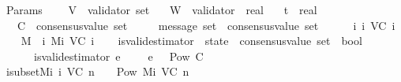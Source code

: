 \begin{isabellebody}
\isanewline
{}\isamarkupfalse%
\ Params\ {\isacharequal}\isanewline
\ \ \ V\ {\isacharcolon}{\isacharcolon}\ {\isachardoublequoteopen}validator\ set{\isachardoublequoteclose}\isanewline
\ \ \ W\ {\isacharcolon}{\isacharcolon}\ {\isachardoublequoteopen}validator\ {\isasymRightarrow}\ real{\isachardoublequoteclose}\isanewline
\ \ \ t\ {\isacharcolon}{\isacharcolon}\ real\isanewline
\ \ \ C\ {\isacharcolon}{\isacharcolon}\ {\isachardoublequoteopen}consensus{\isacharunderscore}value\ set{\isachardoublequoteclose}\isanewline
\ \ \ {\isasymepsilon}\ {\isacharcolon}{\isacharcolon}\ {\isachardoublequoteopen}message\ set\ {\isasymRightarrow}\ consensus{\isacharunderscore}value\ set{\isachardoublequoteclose}\isanewline
\isanewline
{}\isanewline
\ \ \isamarkupfalse%
\ {\isachardoublequoteopen}{\isasymSigma}\ {\isacharequal}\ {\isacharparenleft}{\isasymUnion}i{\isasymin}{\isasymnat}{\isachardot}\ {\isasymSigma}{\isacharunderscore}i\ {\isacharparenleft}V{\isacharcomma}C{\isacharcomma}{\isasymepsilon}{\isacharparenright}\ i{\isacharparenright}{\isachardoublequoteclose}\isanewline
\ \ \isamarkupfalse%
\ {\isachardoublequoteopen}M\ {\isacharequal}\ {\isacharparenleft}{\isasymUnion}i{\isasymin}{\isasymnat}{\isachardot}\ M{\isacharunderscore}i\ {\isacharparenleft}V{\isacharcomma}C{\isacharcomma}{\isasymepsilon}{\isacharparenright}\ i{\isacharparenright}{\isachardoublequoteclose}\isanewline
\ \ \isamarkupfalse%
\ is{\isacharunderscore}valid{\isacharunderscore}estimator\ {\isacharcolon}{\isacharcolon}\ {\isachardoublequoteopen}{\isacharparenleft}state\ {\isasymRightarrow}\ consensus{\isacharunderscore}value\ set{\isacharparenright}\ {\isasymRightarrow}\ bool{\isachardoublequoteclose}\isanewline
\ \ \ \ \isanewline
\ \ \ \ \ \ {\isachardoublequoteopen}is{\isacharunderscore}valid{\isacharunderscore}estimator\ e\ {\isacharequal}\ {\isacharparenleft}{\isasymforall}{\isasymsigma}\ {\isasymin}\ {\isasymSigma}{\isachardot}\ e\ {\isasymsigma}\ {\isasymin}\ Pow\ C\ {\isacharminus}\ {\isacharbraceleft}{\isasymemptyset}{\isacharbraceright}{\isacharparenright}{\isachardoublequoteclose}\isanewline
\isanewline
\ \ \isanewline
\ \ \isamarkupfalse%
\ {\isasymSigma}i{\isacharunderscore}subset{\isacharunderscore}Mi{\isacharcolon}\ {\isachardoublequoteopen}{\isasymSigma}{\isacharunderscore}i\ {\isacharparenleft}V{\isacharcomma}C{\isacharcomma}{\isasymepsilon}{\isacharparenright}\ {\isacharparenleft}n\ {\isacharplus}\ {}{\isacharparenright}\ {\isasymsubseteq}\ Pow\ {\isacharparenleft}M{\isacharunderscore}i\ {\isacharparenleft}V{\isacharcomma}C{\isacharcomma}{\isasymepsilon}{\isacharparenright}\ n{\isacharparenright}{\isachardoublequoteclose}\isanewline

\end{isabellebody}
